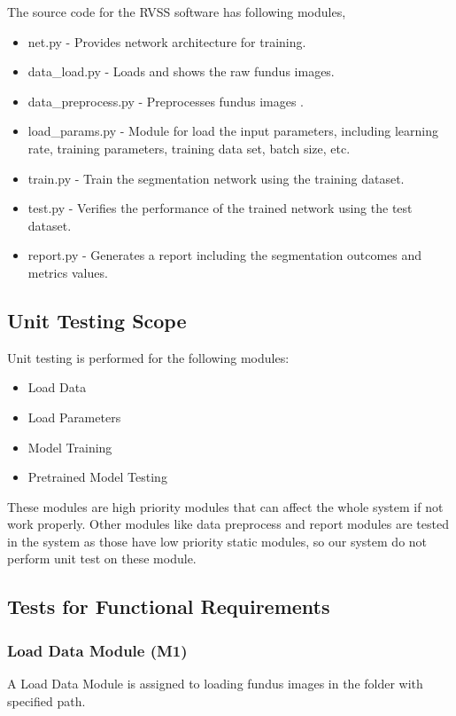 \documentclass[12pt, titlepage]{article}
\begin{document}
The source code for the RVSS software has following modules, 
\begin{itemize}
    \item net.py - Provides network architecture for training. 
    \item data\_load.py - Loads and shows the raw fundus images. 
    \item data\_preprocess.py - Preprocesses fundus images .
    \item load\_params.py - Module for load the input parameters, including learning rate, training parameters, training data set, batch size, etc.
    \item train.py - Train the segmentation network using the training dataset. 
    \item test.py - Verifies the performance of the trained network using the test dataset.
    \item report.py - Generates a report including the segmentation outcomes and metrics values.
    
\end{itemize}

\subsection{Unit Testing Scope}
Unit testing is performed for the following modules: 

\begin{itemize}
    \item Load Data 
    \item Load Parameters
    \item Model Training
    \item Pretrained Model Testing
\end{itemize}
These modules are high priority modules that can affect the whole system if not work properly. Other modules like data preprocess and report modules are tested in the system as those have low priority static modules, so our system do not perform unit test on these module.  

\subsection{Tests for Functional Requirements} 

\subsubsection{Load Data Module (M1)}
A Load Data Module is assigned to loading fundus images in the folder with specified path.
\end{document}
